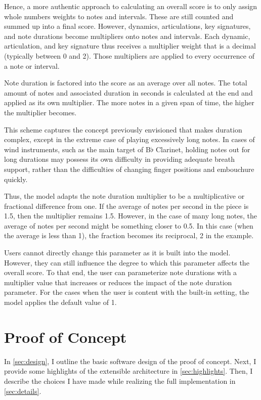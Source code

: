 \documentclass[12pt]{report}
\begin{document}
Hence, a more authentic approach to calculating an overall score is to only assign whole numbers weights to notes and intervals. These are still counted and summed up into a final score. However, dynamics, articulations, key signatures, and note durations become multipliers onto notes and intervals. Each dynamic, articulation, and key signature thus receives a multiplier weight that is a decimal (typically between 0 and 2). Those multipliers are applied to every occurrence of a note or interval.

Note duration is factored into the score as an average over all notes. The total amount of notes and associated duration in seconds is calculated at the end and applied as its own multiplier. The more notes in a given span of time, the higher the multiplier becomes.

This scheme captures the concept previously envisioned that makes duration complex, except in the extreme case of playing excessively long notes. In cases of wind instruments, such as the main target of B$\flat$ Clarinet, holding notes out for long durations may possess its own difficulty in providing adequate breath support, rather than the difficulties of changing finger positions and embouchure quickly.

Thus, the model adapts the note duration multiplier to be a multiplicative or fractional difference from one. If the average of notes per second in the piece is 1.5, then the multiplier remains 1.5. However, in the case of many long notes, the average of notes per second might be something closer to 0.5. In this case (when the average is less than 1), the fraction becomes its reciprocal, 2 in the example.

Users cannot directly change this parameter as it is built into the model. However, they can still influence the degree to which this parameter affects the overall score. To that end, the user can parameterize note durations with a multiplier value that increases or reduces the impact of the note duration parameter. For the cases when the user is content with the built-in setting, the model applies the default value of 1.

\chapter{Proof of Concept} 
\label{sec:proof}

In \ref{sec:design}, I outline the basic software design of the proof of concept. Next, I provide some highlights of the extensible architecture in \ref{sec:highlights}. Then, I describe the choices I have made while realizing the full implementation in \ref{sec:details}.
\end{document}
